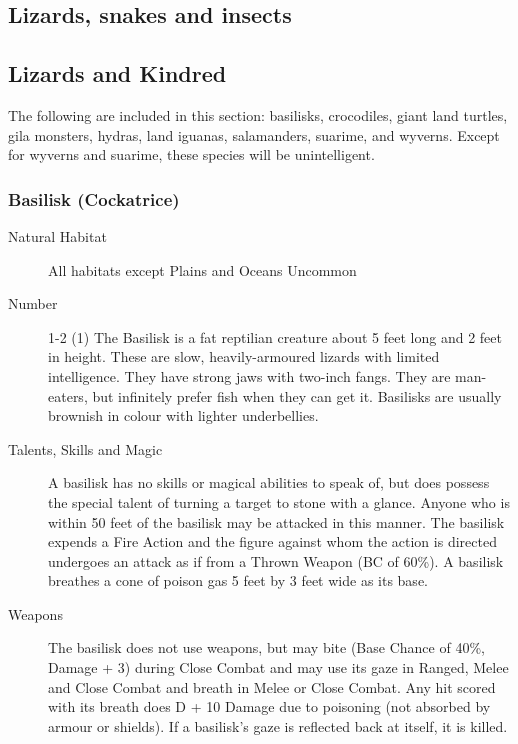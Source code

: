 \begin{multicols}{2}

\setlength\columnseprule{0.2mm}

\section{Lizards, snakes and insects}

\subsection{Lizards and Kindred}
The following are included in this section: basilisks, crocodiles,
giant land turtles, gila monsters, hydras, land iguanas, salamanders,
suarime, and wyverns.  Except for wyverns and suarime, these species
will be unintelligent.

\subsubsection{Basilisk (Cockatrice)}

\begin{description}
\item[Natural Habitat] All habitats except Plains and Oceans Uncommon

\item[Number] 1-2 (1)
 The Basilisk is a fat reptilian creature about 5 feet
long and 2 feet in height. These are slow, heavily-armoured lizards
with limited intelligence.  They have strong jaws with two-inch
fangs.  They are man-eaters, but infinitely prefer fish when they can
get it.  Basilisks are usually brownish in colour with lighter
underbellies.

\item[Talents, Skills and Magic] A basilisk has no skills or magical abilities to speak of,
but does possess the special talent of turning a target to stone with
a glance.  Anyone who is within 50 feet of the basilisk may be
attacked in this manner.  The basilisk expends a Fire Action and the
figure against whom the action is directed undergoes an attack as if
from a Thrown Weapon (BC of 60\%). A basilisk breathes a cone of
poison gas 5 feet by 3 feet wide as its base.

\item[Weapons] The basilisk does not use weapons, but may bite (Base Chance
of 40\%, Damage + 3) during Close Combat and may use its gaze in
Ranged, Melee and Close Combat and breath in Melee or Close Combat.
Any hit scored with its breath does D + 10 Damage due to poisoning
(not absorbed by armour or shields). If a basilisk's gaze is reflected
back at itself, it is killed.



\end{description}
\end{multicols}
